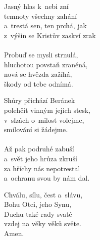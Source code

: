 \begin{translatioMulticol}{3}
Jasný hlas k~nebi zní\\
temnoty všechny zahání\\
a~trestá sen, ten prchá, jak\\
z~výšin se Kristův zaskví zrak\\
\\
Probuď se mysli strnulá,\\
hluchotou povstaň zraněná,\\
nová se hvězda zažíhá,\\
škody od tebe odnímá.\columnbreak

Shůry přichází Beránek\\
polehčit vinným jejich stesk,\\
v~slzách o~milost volejme,\\
smilování si žádejme.\\
\\
Až pak podruhé zabuší\\
a~svět jeho hrůza zkruší\\
za hříchy nás nepotrestal\\
a~ochranu svou by nám dal.\columnbreak

Chválu, sílu, čest a~slávu,\\
Bohu Otci, jeho Synu,\\
Duchu také rady svaté\\
vzdej na věky věků světe.\\
Amen.
\end{translatioMulticol}
